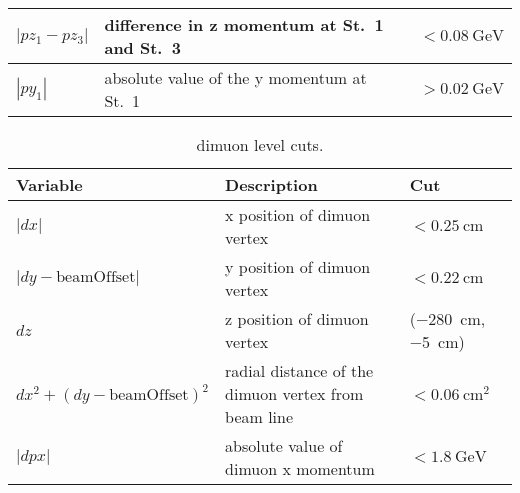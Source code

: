\documentclass[../main.tex]{subfiles}
\begin{document}
\begin{table}[ht!]
\begin{tabular}{|m{4.5cm}|m{7cm}|m{3cm}|}
		$|pz_1 - pz_3|$                                                                                                                                                                              & difference in z momentum at St.~1 and St.~3                                          & $<\SI{0.08}{\GeV}$           \\ \hline
		$|py_1 |$                                                                                                                                                                                    & absolute value of the y momentum   at St.~1                                          & $>\SI{0.02}{\GeV}$           \\ \hline
	\end{tabular}
\end{table}
\begin{table}[ht!]
	\centering
	\caption{dimuon level cuts.}
	\label{table:dimuonCut}
	\begin{tabular}{|m{4.5cm}|m{7cm}|m{3cm}|}
		\hline
		Variable                                                                                                                          & Description                                                                              & Cut                            \\ \hline
		$|dx|$                                                                                                                            & x position of dimuon vertex                                                              & $<\SI{0.25}{\cm}$              \\ \hline
		$|dy-\mathrm{beamOffset}|$                                                                                                        & y position of dimuon vertex                                                              & $<\SI{0.22}{\cm}$              \\ \hline
		$dz$                                                                                                                              & z position of dimuon vertex                                                              & (\SI{-280}{\cm},\SI{-5}{\cm})  \\ \hline
		$dx^2+(dy-\mathrm{beamOffset})^2$                                                                                                 & radial distance of the dimuon vertex from beam line                                      & $<\SI{0.06}{\cm\squared}$      \\ \hline
		$|dpx|$                                                                                                                           & absolute value of dimuon x   momentum                                                    & $<\SI{1.8}{\GeV}$              \\ \hline

\end{tabular}
\end{table}
\end{document}
